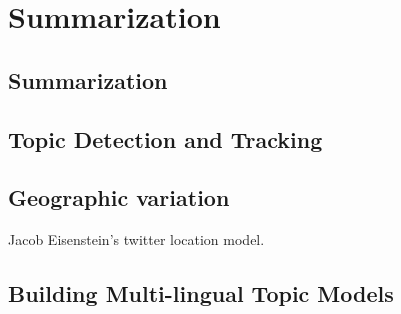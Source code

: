 \chapter{Summarization}
\label{ch:summarization}

\section{Summarization}

\section{Topic Detection and Tracking}






\section{Geographic variation}




Jacob Eisenstein's twitter location model.


\section{Building Multi-lingual Topic Models}

